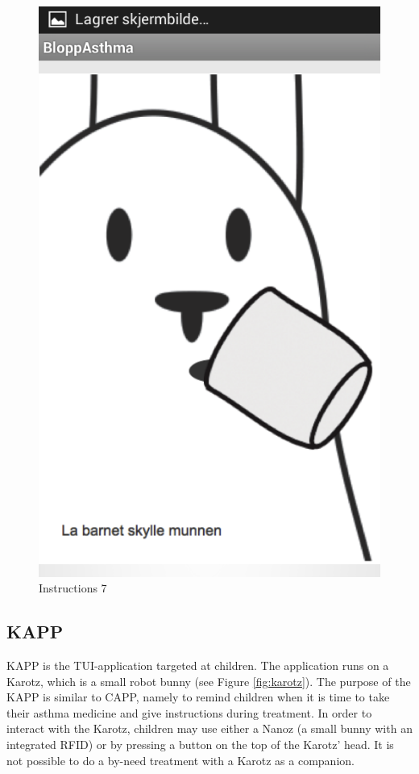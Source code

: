 \begin{figure}[H]
	\begin{minipage}[b]{0.3\linewidth}
		\centering
		\includegraphics[width=0.20\paperwidth]{Pictures/app-screenshots/instructions-7.png}
		\caption{Instructions 7}
		\label{fig:instructions-7}
	\end{minipage}
\end{figure}


\subsection{KAPP}
\label{sec:description-kapp}
KAPP is the TUI-application targeted at children. The application runs on a Karotz, which is a small robot bunny (see Figure \ref{fig:karotz}). The purpose of the KAPP is similar to CAPP, namely to remind children when it is time to take their asthma medicine and give instructions during treatment. In order to interact with the Karotz, children may use either a Nanoz (a small bunny with an integrated RFID) or by pressing a button on the top of the Karotz' head. It is not possible to do a by-need treatment with a Karotz as a companion. 

